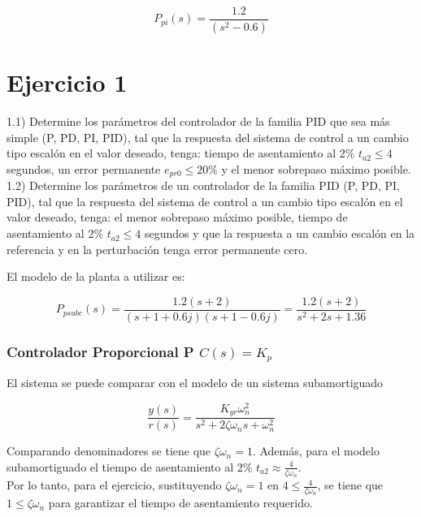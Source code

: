 \documentclass{report}
\begin{document}
\begin{equation*}
    P_{pi}(s) = \frac{1.2}{(s^2-0.6)}
\label{Eq:4}
\end{equation*}

\section*{Ejercicio 1}

1.1) Determine los parámetros del controlador de la familia PID que sea más simple (P,
PD, PI, PID), tal que la respuesta del sistema de control a un cambio tipo escalón en el valor
deseado, tenga: tiempo de asentamiento al 2\% \(t_{a2} \leqslant 4\) segundos, un error permanente \(e_{pr0} \leqslant 
20\%\) y el menor sobrepaso máximo posible.\\

1.2) Determine los parámetros de un controlador de la familia PID (P, PD, PI, PID), tal que la respuesta del sistema de control a un cambio tipo escalón en el valor deseado, tenga: el
menor sobrepaso máximo posible, tiempo de asentamiento al 2\% \(t_{a2} \leqslant 4\) segundos y que la respuesta a un cambio escalón en la referencia y en la perturbación tenga error 
permanente cero.

El modelo de la planta a utilizar es:

\begin{equation*}
    P_{psubc}(s) = \frac{1.2(s+2)}{(s+1+0.6 j)(s+1-0.6 j)} = \frac{1.2(s+2)}{s^2+2s+1.36} 
\label{Eq:5}
\end{equation*}

\subsubsection{Controlador Proporcional P \(C(s) = K_p\)}
El sistema se puede comparar con el modelo de un sistema subamortiguado 

\begin{equation*}
    \frac{y(s)}{r(s)}=\frac{K_{yr}\omega_n^2}{s^2+2\zeta \omega_ns+\omega_n^2}
\label{Eq:6}
\end{equation*}

Comparando denominadores se tiene que \(\zeta \omega_n = 1\). Además, para el modelo subamortiguado el tiempo de 
asentamiento al 2\% \(t_{a2} \approx \frac{4}{\zeta \omega_n}\).\\

Por lo tanto, para el ejercicio, sustituyendo \(\zeta \omega_n = 1\) en \(4 \leqslant \frac{4}{\zeta \omega_n}\), se tiene 
que \(1 \leqslant \zeta \omega_n\) para garantizar el tiempo de asentamiento requerido.\\
\end{document}

